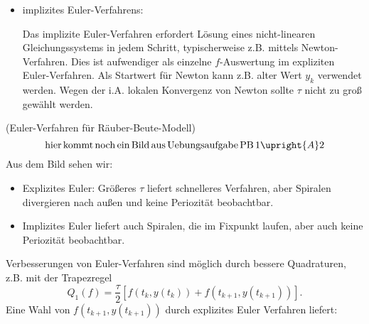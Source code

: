 \documentclass{book}
\newcommand{\tmop}[1]{\ensuremath{\operatorname{#1}}}
\newcommand{\tmtextit}[1]{\text{{\itshape{#1}}}}
\newcommand{\tmverbatim}[1]{\text{{\ttfamily{#1}}}}
\newenvironment{itemizedot}{\begin{itemize} \renewcommand{\labelitemi}{$\bullet$}\renewcommand{\labelitemii}{$\bullet$}\renewcommand{\labelitemiii}{$\bullet$}\renewcommand{\labelitemiv}{$\bullet$}}{\end{itemize}}
\newenvironment{tmcode}[1][]{\begin{alltt} }{\end{alltt}}
\begin{document}
\begin{remark*}
\begin{itemizedot}
\[{       \begin{tmcode}
       \tmverbatim{\backslash \tmop{textbackslash} \tmop{end}
       \backslash\{\tmop{tikzpicture} \backslash\}}
       \end{tmcode}
       
       \begin{tmcode}
       \tmverbatim{\backslash \tmop{textbackslash} \tmop{end}
       \backslash\{\tmop{document} \backslash\}}
       \end{tmcode}}{\raisebox{-0.00196250541413847\height}{\texttt{[image: k1-9.pdf]}}}
    \]
    \item {\underline{\tmtextit{Rechenaufwand}}} implizites Euler-Verfahrens:
    
    Das implizite Euler-Verfahren erfordert L{\"o}sung eines nicht-linearen
    Gleichungssystems in jedem Schritt, typischerweise z.B. mittels
    Newton-Verfahren. Dies ist aufwendiger als einzelne $f$-Auswertung im
    expliziten Euler-Verfahren. Als Startwert f{\"u}r Newton kann z.B. alter
    Wert $y_k$ verwendet werden. Wegen der i.A. lokalen Konvergenz von Newton
    sollte $\tau$ nicht zu gro{\ss} gew{\"a}hlt werden. 
  \end{itemizedot}
\end{remark*}

\begin{example*}
  (Euler-Verfahren f{\"u}r R{\"a}uber-Beute-Modell)
  \[ \tmop{hier} \tmop{kommt} \tmop{noch} \tmop{ein} \tmop{Bild} \tmop{aus}
     \tmop{Uebungsaufgabe} \tmop{PB} 1 \upright{A} 2 \]
  Aus dem Bild sehen wir:
  \begin{itemizedot}
    \item Explizites Euler: Gr{\"o}{\ss}eres $\tau$ liefert schnelleres
    Verfahren, aber Spiralen divergieren nach au{\ss}en und keine
    Periozit{\"a}t beobachtbar.
    
    \item Implizites Euler liefert auch Spiralen, die im Fixpunkt laufen,
    aber auch keine Periozit{\"a}t beobachtbar. 
  \end{itemizedot}
\end{example*}

Verbesserungen von Euler-Verfahren sind m{\"o}glich durch bessere Quadraturen,
z.B. mit der Trapezregel
\begin{equation}
  Q_1 (f) = \frac{\tau}{2} [f (t_k, y (t_k)) + f (t_{k + 1}, y (t_{k + 1}))] .
\end{equation}
Eine Wahl von $f (t_{k + 1}, y (t_{k + 1}))$ durch explizites Euler Verfahren
liefert:
\end{document}

